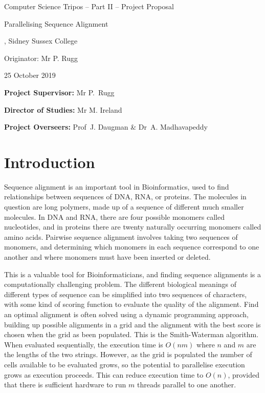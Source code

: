 

\centerline{\Large Computer Science Tripos -- Part II -- Project Proposal}
\vspace{0.4in}
\centerline{\Huge Parallelising Sequence Alignment}
\vspace{0.4in}
\centerline{\large \candidate, Sidney Sussex College}
\vspace{0.1in}
\centerline{\large Originator: Mr P. Rugg}
\vspace{0.1in}
\centerline{\large 25 October 2019}
\vspace{0.5in}

\noindent
{\bf Project Supervisor:} Mr P.~Rugg

\noindent
{\bf Director of Studies:} Mr M. Ireland

\noindent
{\bf Project Overseers:} Prof~J. Daugman  \& Dr~A. Madhavapeddy


\section*{Introduction}

Sequence alignment is an important tool in Bioinformatics, used to find relationships between sequences of DNA, RNA, or proteins.
The molecules in question are long polymers, made up of a sequence of different much smaller molecules.
In DNA and RNA, there are four possible monomers called nucleotides, and in proteins there are twenty naturally occurring monomers called amino acids.
Pairwise sequence alignment involves taking two sequences of monomers, and determining which monomers in each sequence correspond to one another and where monomers must have been inserted or deleted.

This is a valuable tool for Bioinformaticians, and finding sequence alignments is a computationally challenging problem.
The different biological meanings of different types of sequence can be simplified into two sequences of characters, with some kind of scoring function to evaluate the quality of the alignment.
Find an optimal alignment is often solved using a dynamic programming approach, building up possible alignments in a grid and the alignment with the best score is chosen when the grid as been populated.
This is the Smith-Waterman algorithm.
When evaluated sequentially, the execution time is $O(nm)$ where $n$ and $m$ are the lengths of the two strings.
However, as the grid is populated the number of cells available to be evaluated grows, so the potential to parallelise execution grows as execution proceeds.
This can reduce execution time to $O(n)$, provided that there is sufficient hardware to run $m$ threads parallel to one another.

